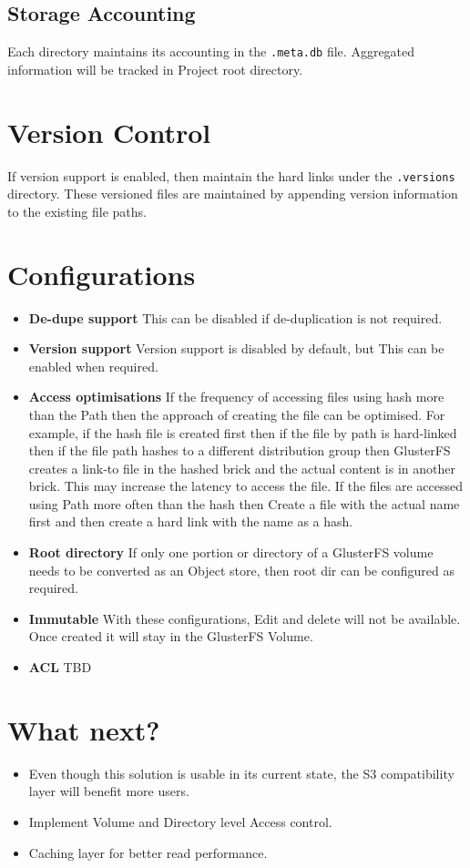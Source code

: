 \documentclass[10pt,a4paper]{article}
\begin{document}
\begin{multicols*}{2}
\subsection{Storage Accounting}
Each directory maintains its accounting in the \texttt{.meta.db} file. Aggregated information will be tracked in Project root directory. 

\section{Version Control}
If version support is enabled, then maintain the hard links under the \texttt{.versions} directory. These versioned files are maintained by appending version information to the existing file paths.

\section{Configurations}
\begin{itemize}
\item \textbf{De-dupe support} This can be disabled if de-duplication is not required.
\item \textbf{Version support} Version support is disabled by default, but This can be enabled when required.
\item \textbf{Access optimisations} If the frequency of accessing files using hash more than the Path then the approach of creating the file can be optimised. For example, if the hash file is created first then if the file by path is hard-linked then if the file path hashes to a different distribution group then GlusterFS creates a link-to file in the hashed brick and the actual content is in another brick. This may increase the latency to access the file. If the files are accessed using Path more often than the hash then Create a file with the actual name first and then create a hard link with the name as a hash.
\item \textbf{Root directory} If only one portion or directory of a GlusterFS volume needs to be converted as an Object store, then root dir can be configured as required.
\item \textbf{Immutable} With these configurations, Edit and delete will not be available. Once created it will stay in the GlusterFS Volume.
\item \textbf{ACL} TBD
\end{itemize}

\section{What next?}
\begin{itemize}
\item Even though this solution is usable in its current state, the S3 compatibility layer will benefit more users.
\item Implement Volume and Directory level Access control.
\item Caching layer for better read performance.
\end{itemize}

\end{multicols*}
\end{document}
